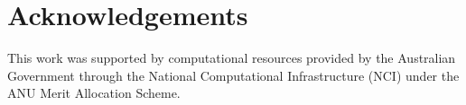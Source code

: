 \chapter*{Acknowledgements}

This work was supported by computational resources provided by the Australian Government through the National Computational Infrastructure (NCI) under the ANU Merit Allocation Scheme.
